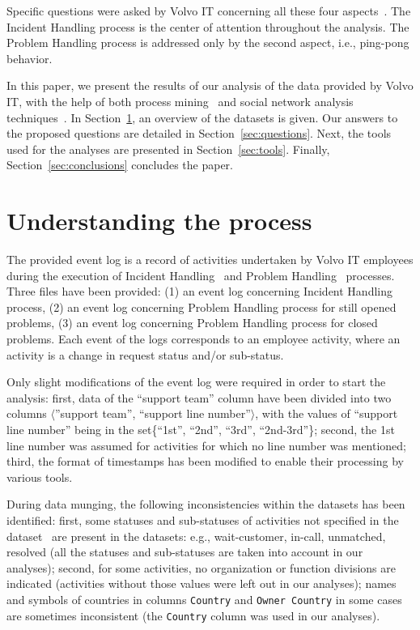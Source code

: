 \documentclass[lnbip]{svmultln}
\begin{document}
Specific questions were asked by Volvo IT concerning all these four aspects~\cite{entry1}. The Incident Handling process is the center of attention throughout the analysis. The Problem Handling process is addressed only by the second aspect, i.e., ping-pong behavior. 

In this paper, we present the results of our analysis of the data provided by Volvo IT, with the help of both process mining~\cite{entry3} and social network analysis techniques~\cite{entry4}. In Section~\ref{sec:understanding}, an overview of the datasets is given. Our answers to the proposed questions are detailed in Section~\ref{sec:questions}. Next, the tools used for the analyses are presented in Section~\ref{sec:tools}. Finally, Section~\ref{sec:conclusions} concludes the paper.

\section{Understanding the process}
\label{sec:understanding}

The provided event log is a record of activities undertaken by Volvo IT employees during the execution of Incident Handling~\cite{entry5} and Problem Handling~\cite{entry6, entry7} processes. Three files have been provided: (1) an event log concerning Incident Handling process, (2) an event log concerning Problem Handling process for still opened problems, (3) an event log concerning Problem Handling process for closed problems. Each event of the logs corresponds to an employee activity, where an activity is a change in request status and/or sub-status.

Only slight modifications of the event log were required in order to start the analysis: first, data of the ``support team'' column have been divided into two columns $\langle$''support team'', ``support line number''$\rangle$, with the values of ``support line number'' being in the set\{``1st'', ``2nd'', ``3rd'', ``2nd-3rd''\}; second, the 1st line number was assumed for activities for which no line number was mentioned; third, the format of timestamps has been modified to enable their processing by various tools.

During data munging, the following inconsistencies within the datasets has been identified: first, some statuses and sub-statuses of activities not specified in the dataset~\cite{entry1} are present in the datasets: e.g., wait-customer, in-call, unmatched, resolved (all the statuses and sub-statuses are taken into account in our analyses); second, for some activities, no organization or function divisions are indicated (activities without those values were left out in our analyses); names and symbols of countries in columns \texttt{Country} and \texttt{Owner Country} in some cases are sometimes inconsistent (the \texttt{Country} column was used in our analyses).
\end{document}
